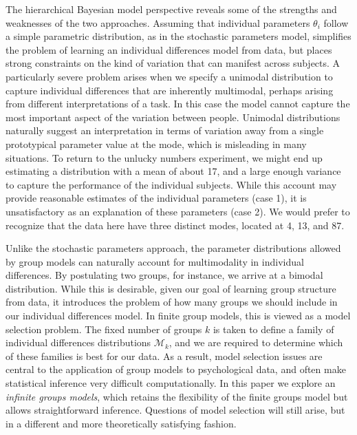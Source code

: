 \documentclass[authoryear]{elsarticle}
\begin{document}
The hierarchical Bayesian model perspective reveals some of the strengths and
weaknesses of the two approaches. Assuming that individual parameters
$\theta_i$ follow a simple parametric distribution, as in the stochastic
parameters model, simplifies the problem of learning an individual differences
model from data, but places strong constraints on the kind of variation that
can manifest across subjects.  A particularly severe problem arises when we
specify a unimodal distribution to capture individual differences that are
inherently multimodal, perhaps arising from different interpretations of
a task. In this case the model cannot capture the most
important aspect of the variation between people. Unimodal distributions naturally suggest an interpretation
in terms of variation away from a single prototypical parameter value
at the mode, which is misleading in many situations. To return to
the unlucky numbers experiment, we might end up estimating a
distribution with a mean of about 17, and a large enough variance to
capture the performance of the individual subjects. While this account
may provide reasonable estimates of the individual parameters (case 1),
it is unsatisfactory as an explanation of these parameters (case 2).
We would prefer to recognize that
the data here have three distinct modes, located at 4, 13, and 87.

Unlike the stochastic parameters approach, the parameter distributions
allowed by group models can naturally account for multimodality in
individual differences. By postulating two groups, for instance, we arrive
at a bimodal distribution. While this is desirable, given our goal of learning
group structure from data, it introduces the problem of how many groups
we should include in our individual differences model. In finite group models,
this is viewed as a model selection problem. The fixed number of groups $k$ is taken
to define a family of individual differences distributions $\mathcal{M}_k$,
and we are required to determine which of these families is best for our data.
As a result, model selection issues are central to the application of group
models to psychological data, and often make statistical inference very
difficult computationally. In this paper we explore an {\it infinite groups models}, which retains
the flexibility of the finite groups model but allows straightforward inference.
Questions of model selection will still arise, but in a different and more theoretically
satisfying fashion.
\end{document}
